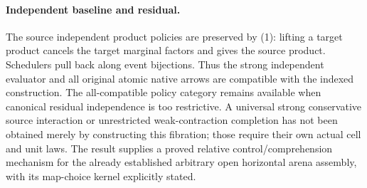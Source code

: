 \documentclass[11pt]{article}
\begin{document}
\paragraph{Independent baseline and residual.}
The source independent product policies are preserved by (1): lifting a target product cancels the target marginal factors and gives the source product. Schedulers pull back along event bijections. Thus the strong independent evaluator and all original atomic native arrows are compatible with the indexed construction. The all-compatible policy category remains available when canonical residual independence is too restrictive. A universal strong conservative source interaction or unrestricted weak-contraction completion has not been obtained merely by constructing this fibration; those require their own actual cell and unit laws. The result supplies a proved relative control/comprehension mechanism for the already established arbitrary open horizontal arena assembly, with its map-choice kernel explicitly stated.
\end{document}
